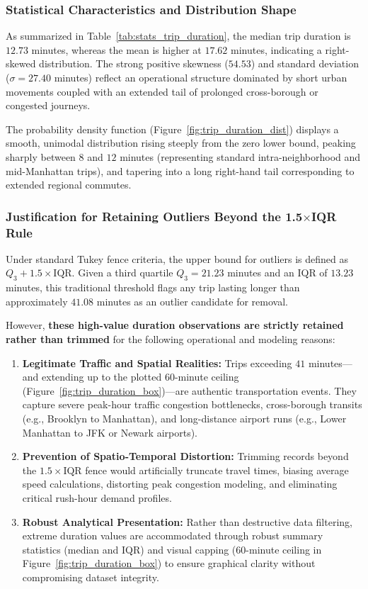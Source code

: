 \documentclass[11pt,a4paper]{article}
\begin{document}
\subsubsection{Statistical Characteristics and Distribution Shape}
As summarized in Table~\ref{tab:stats_trip_duration}, the median trip duration is $12.73$ minutes, whereas the mean is higher at $17.62$ minutes, indicating a right-skewed distribution. The strong positive skewness ($54.53$) and standard deviation ($\sigma = 27.40$ minutes) reflect an operational structure dominated by short urban movements coupled with an extended tail of prolonged cross-borough or congested journeys.

The probability density function (Figure~\ref{fig:trip_duration_dist}) displays a smooth, unimodal distribution rising steeply from the zero lower bound, peaking sharply between $8$ and $12$ minutes (representing standard intra-neighborhood and mid-Manhattan trips), and tapering into a long right-hand tail corresponding to extended regional commutes.

\subsubsection{Justification for Retaining Outliers Beyond the 1.5$\times$IQR Rule}
Under standard Tukey fence criteria, the upper bound for outliers is defined as $Q_3 + 1.5 \times \text{IQR}$. Given a third quartile $Q_3 = 21.23$ minutes and an IQR of $13.23$ minutes, this traditional threshold flags any trip lasting longer than approximately $41.08$ minutes as an outlier candidate for removal.

However, \textbf{these high-value duration observations are strictly retained rather than trimmed} for the following operational and modeling reasons:
\begin{enumerate}
    \item \textbf{Legitimate Traffic and Spatial Realities:} Trips exceeding $41$ minutes—and extending up to the plotted $60$-minute ceiling (Figure~\ref{fig:trip_duration_box})—are authentic transportation events. They capture severe peak-hour traffic congestion bottlenecks, cross-borough transits (e.g., Brooklyn to Manhattan), and long-distance airport runs (e.g., Lower Manhattan to JFK or Newark airports).
    \item \textbf{Prevention of Spatio-Temporal Distortion:} Trimming records beyond the $1.5 \times \text{IQR}$ fence would artificially truncate travel times, biasing average speed calculations, distorting peak congestion modeling, and eliminating critical rush-hour demand profiles.
    \item \textbf{Robust Analytical Presentation:} Rather than destructive data filtering, extreme duration values are accommodated through robust summary statistics (median and IQR) and visual capping ($60$-minute ceiling in Figure~\ref{fig:trip_duration_box}) to ensure graphical clarity without compromising dataset integrity.
\end{enumerate}
\end{document}

